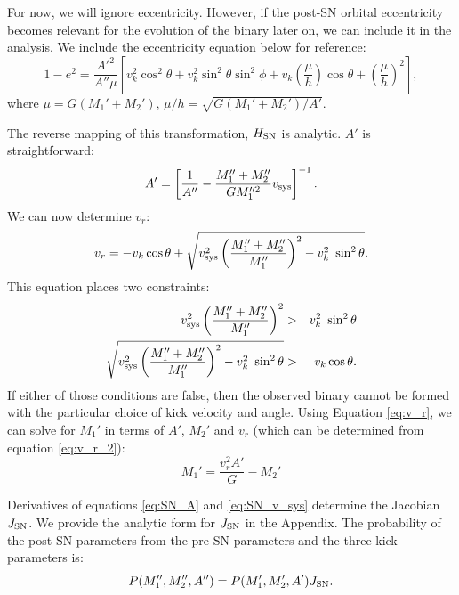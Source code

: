 \documentclass[12pt, preprint]{aastex}
\begin{document}
For now, we will ignore eccentricity. However, if the post-SN orbital eccentricity becomes relevant for the evolution of the binary later on, we can include it in the analysis. We include the eccentricity equation below for reference:
\begin{equation}
1-e^2 = \frac{A'^2}{A'' \mu} \left[ v_k^2 \cos^2\theta + v_k^2 \sin^2 \theta \sin^2 \phi + v_k \left( \frac{\mu}{h} \right) \cos \theta + \left( \frac{\mu}{h} \right)^2  \right], \label{eq:SN_e}
\end{equation}
where $\mu = G(M_1' + M_2')$, $\mu/h = \sqrt{G(M_1'+M_2') / A'}$.

The reverse mapping of this transformation, $H_{\rm SN}$ is analytic. $A'$ is straightforward:
\begin{equation}
A' = \left[ \frac{1}{A''} - \frac{M_1'' + M_2''}{G M_1''^2} v_{\rm sys} \right]^{-1}.
\end{equation}
We can now determine $v_r$:
\begin{equation}
v_r = -v_k \cos \theta + \sqrt{v_{\rm sys}^2 \left( \frac{M_1'' + M_2''}{M_1''} \right)^2 - v_k^2\ \sin^2 \theta}. \label{eq:v_r_2}
\end{equation}
This equation places two constraints:
\begin{eqnarray}
v_{\rm sys}^2 \left( \frac{M_1'' + M_2''}{M_1''} \right)^2 &>& v_k^2\ \sin^2 \theta \\ 
\sqrt{v_{\rm sys}^2 \left( \frac{M_1'' + M_2''}{M_1''} \right)^2 - v_k^2\ \sin^2 \theta} &>& v_k \cos \theta.
\end{eqnarray}
If either of those conditions are false, then the observed binary cannot be formed with the particular choice of kick velocity and angle. Using Equation \ref{eq:v_r}, we can solve for $M_1'$ in terms of $A'$, $M_2'$ and $v_r$ (which can be determined from equation \ref{eq:v_r_2}):
\begin{equation}
M_1' = \frac{v_r^2 A'}{G} - M_2'
\end{equation}


Derivatives of equations \ref{eq:SN_A} and \ref{eq:SN_v_sys} determine the Jacobian $J_{\rm SN}$. We provide the analytic form for $J_{\rm SN}$ in the Appendix. The probability of the post-SN parameters from the pre-SN parameters and the three kick parameters is:
\begin{equation}
P(M_1'', M_2'', A'') = P(M_1', M_2', A') J_{\rm SN}. \label{eq:P_SN}
\end{equation}
\end{document}
